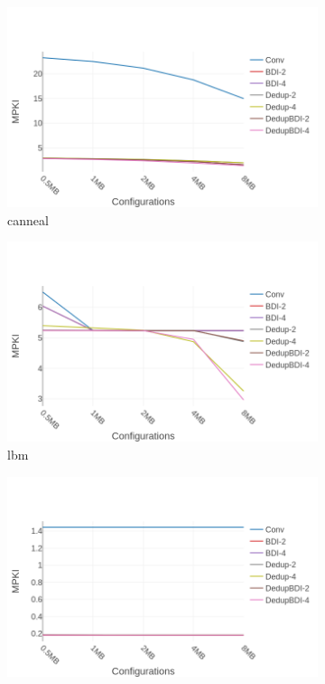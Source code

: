 \begin{figure}
    \begin{subfigure}{0.5\textwidth}
        \includegraphics[width=\textwidth]{canneal-mpki.png}
        \caption{canneal}
    \end{subfigure}
    \begin{subfigure}{0.5\textwidth}
        \includegraphics[width=\textwidth]{lbm-mpki.png}
        \caption{lbm}
    \end{subfigure}
    \begin{subfigure}{0.5\textwidth}
        \includegraphics[width=\textwidth]{jmeint-mpki.png}

\end{subfigure}
\end{figure}
